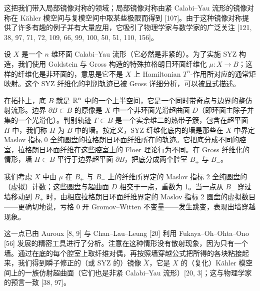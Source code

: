 这把我们带入局部镜像对称的领域；局部镜像对称由紧 Calabi--Yau 流形的镜像对称在 Kähler 模空间与复模空间中取某些极限而得到 [107]。由于这种镜像对称提供了许多有趣的例子并有大量应用，它吸引了物理学家与数学家的广泛关注 [121, 38, 97, 71, 72, 109, 66, 99, 100, 50, 51, 110, 156]。

设 $X$ 是一个 $n$ 维环面 Calabi--Yau 流形（它必然是非紧的）。为了实施 SYZ 构造，我们使用 Goldstein 与 Gross 构造的特殊拉格朗日环面纤维化 $\mu:X\to B$；这样的纤维化是非环面的，意思是它不是 $X$ 上 Hamiltonian $T^n$-作用所对应的通常矩映射。这个 SYZ 纤维化的判别轨迹已被 Gross 详细分析，可以被显式描述。

在拓扑上，底 $B$ 就是 $\mathbb{R}^n$ 中的一个上半空间，它是一个同时带奇点与边界的整仿射流形。边界 $\partial B\subset B$ 的原像是 $X$ 中一个非环面光滑超曲面 $D$（即环面主除子并集的一个光滑化）。判别轨迹 $\Gamma\subset B$ 是一个实余维二的热带子簇，包含在超平面 $H$ 中，我们称 $H$ 为 $B$ 中的墙。按定义，SYZ 纤维化底内的墙是那些在 $X$ 中界定 Maslov 指标 0 全纯圆盘的拉格朗日环面纤维所在的轨迹。它把底分成不同的腔室，拉格朗日环面纤维在这些腔室上的 Floer 理论行为不同。在 Gross 纤维化的情形，墙 $H\subset B$ 平行于边界超平面 $\partial B$，把底分成两个腔室 $B_+$ 与 $B_-$。

我们考虑 $X$ 中由 $\mu$ 在 $B_+$ 与 $B_-$ 上的纤维所界定的 Maslov 指标 2 全纯圆盘的（虚拟）计数；这些圆盘与超曲面 $D$ 相交于一点，重数为 1。当一点从 $B_-$ 穿过墙移动到 $B_+$ 时，由相应拉格朗日环面纤维界定的 Maslov 指标 2 圆盘的虚拟数目------更确切地说，亏格 0 开 Gromov--Witten 不变量------发生跳变，表现出墙穿越现象。

这一点已由 Auroux [8, 9] 与 Chan--Lau--Leung [20] 利用 Fukaya--Oh--Ohta--Ono [56] 发展的精密工具进行了分析。注意在这种情形没有散射现象，因为只有一个墙。通过在底的每个腔室上取纤维对偶，再按照墙穿越公式把所得的各块粘接起来，我们得到瞬子修正的（或 SYZ 的）镜像 $\check X$，它是 $X$ 的（复化）Kähler 模空间上的一族仿射超曲面（它们也是非紧 Calabi--Yau 流形）[20, 3]；这与物理学家的预言一致 [38, 97]。


